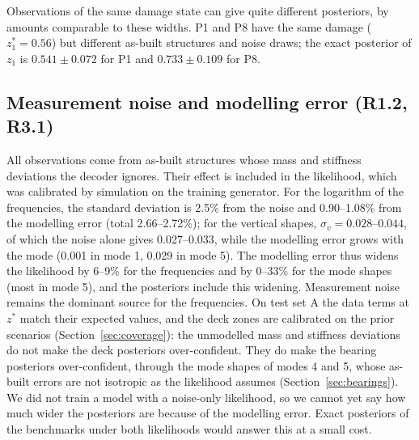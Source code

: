 \documentclass[11pt]{article}
\begin{document}
Observations of the same damage state can give quite different posteriors, by amounts comparable to these widths.
P1 and P8 have the same damage ($z_1^*=0.56$) but different as-built structures and noise draws; the exact posterior of
$z_1$ is $0.541\pm0.072$ for P1 and $0.733\pm0.109$ for P8.

\subsection{Measurement noise and modelling error (R1.2, R3.1)}
All observations come from as-built structures whose mass and stiffness deviations the decoder ignores. Their effect
is included in the likelihood, which was calibrated by simulation on the training generator. For the logarithm of the
frequencies, the standard deviation is 2.5\% from the noise and 0.90--1.08\% from the modelling error (total
2.66--2.72\%); for the vertical shapes, $\sigma_v=0.028$--$0.044$, of which the noise alone gives 0.027--0.033, while
the modelling error grows with the mode (0.001 in mode 1, 0.029 in mode 5). The modelling error thus widens the
likelihood by 6--9\% for the frequencies and by 0--33\% for the mode shapes (most in mode 5), and the posteriors
include this widening. Measurement noise remains the dominant source for the frequencies. On test set A the data
terms at $z^*$ match their expected values, and the deck zones are calibrated on the prior scenarios
(Section~\ref{sec:coverage}): the unmodelled mass and stiffness deviations do not make the deck posteriors
over-confident. They do make the bearing posteriors over-confident, through the mode shapes of modes 4 and 5, whose
as-built errors are not isotropic as the likelihood assumes (Section~\ref{sec:bearings}). We did not train a model with a noise-only
likelihood, so we cannot yet say how much wider the posteriors are because of the modelling error. Exact posteriors of
the benchmarks under both likelihoods would answer this at a small cost.
\end{document}
